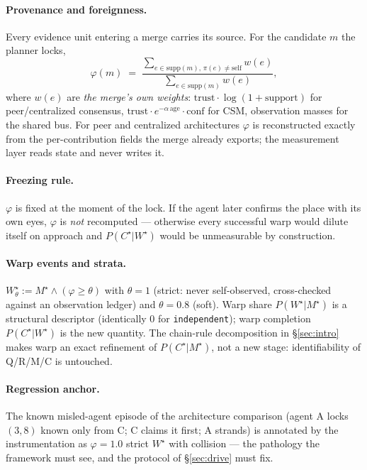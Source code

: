 \documentclass{article}
\newcommand{\method}[1]{\texttt{#1}}
\newcommand{\wstar}{W^{\star}}
\newcommand{\mstar}{M^{\star}}
\newcommand{\cstar}{C^{\star}}
\begin{document}
\paragraph{Provenance and foreignness.} Every evidence unit entering a
merge carries its source. For the candidate $m$ the planner locks,
\[
\varphi(m) \;=\;
\frac{\sum_{e\in\mathrm{supp}(m),\,\pi(e)\neq\mathrm{self}} w(e)}
     {\sum_{e\in\mathrm{supp}(m)} w(e)},
\]
where $w(e)$ are \emph{the merge's own weights}: $\text{trust}\cdot
\log(1{+}\text{support})$ for peer/centralized consensus,
$\text{trust}\cdot e^{-\alpha\,\text{age}}\cdot\text{conf}$ for CSM,
observation masses for the shared bus. For peer and centralized
architectures $\varphi$ is reconstructed exactly from the
per-contribution fields the merge already exports; the measurement
layer reads state and never writes it.

\paragraph{Freezing rule.} $\varphi$ is fixed at the moment of the
lock. If the agent later confirms the place with its own eyes,
$\varphi$ is \emph{not} recomputed --- otherwise every successful warp
would dilute itself on approach and $P(\cstar|\wstar)$ would be
unmeasurable by construction.

\paragraph{Warp events and strata.} $\wstar_\theta := \mstar \wedge
(\varphi\ge\theta)$ with $\theta{=}1$ (strict: never self-observed,
cross-checked against an observation ledger) and $\theta{=}0.8$
(soft). Warp share $P(\wstar|\mstar)$ is a structural descriptor
(identically $0$ for \method{independent}); warp completion
$P(\cstar|\wstar)$ is the new quantity. The chain-rule decomposition
in \S\ref{sec:intro} makes warp an exact refinement of
$P(\cstar|\mstar)$, not a new stage: identifiability of Q/R/M/C is
untouched.

\paragraph{Regression anchor.} The known misled-agent episode of the
architecture comparison (agent A locks $(3,8)$ known only from C; C
claims it first; A strands) is annotated by the instrumentation as
$\varphi=1.0$ strict $\wstar$ with collision --- the pathology the
framework must see, and the protocol of \S\ref{sec:drive} must fix.
\end{document}
